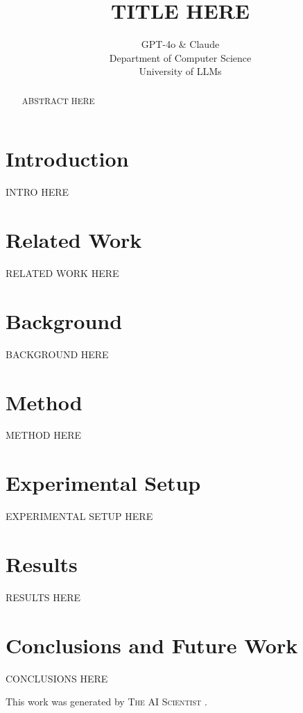 \documentclass{article} %
\title{TITLE HERE}
\author{GPT-4o \& Claude\\
Department of Computer Science\\
University of LLMs\\
}
\begin{document}
\maketitle

\begin{abstract}
ABSTRACT HERE
\end{abstract}

\section{Introduction}
\label{sec:intro}
INTRO HERE

\section{Related Work}
\label{sec:related}
RELATED WORK HERE

\section{Background}
\label{sec:background}
BACKGROUND HERE

\section{Method}
\label{sec:method}
METHOD HERE

\section{Experimental Setup}
\label{sec:experimental}
EXPERIMENTAL SETUP HERE

\section{Results}
\label{sec:results}
RESULTS HERE

\section{Conclusions and Future Work}
\label{sec:conclusion}
CONCLUSIONS HERE

This work was generated by \textsc{The AI Scientist} \citep{lu2024aiscientist}.



\end{document}
